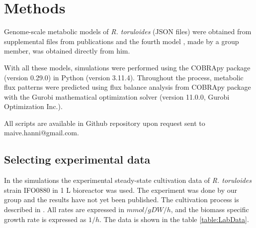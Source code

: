 \chapter{Methods}



Genome-scale metabolic models of \textit{R. toruloides} (JSON files) were obtained from supplemental
files from publications \cite{Tiukova2019, Dinh2019, Kim2021} and the fourth model \cite{DeBiaggi2023}, 
made by a group member, was obtained directly from him. 

With all these models, simulations were performed using the COBRApy
package (version 0.29.0) \cite{Ebrahim2013} in Python (version 3.11.4). 
Throughout the process, metabolic flux patterns were predicted using flux balance analysis \cite{Orth2010} from COBRApy package
with the Gurobi mathematical optimization solver (version 11.0.0, Gurobi Optimization Inc.).

All scripts are available in Github repository upon request sent to maive.hanni@gmail.com.


\section{Selecting experimental data}

In the simulations the experimental steady-state cultivation data of \textit{R. toruloides} strain IFO0880 in 1 L bioreactor was used.
The experiment was done by our group and the results have not yet been published. The cultivation process is described in \cite{Rekena2023}. 
All rates are expressed in $mmol/gDW/h$, and the biomass specific growth rate 
is expressed as ${1/h}$. The data is shown in the table \ref{table:LabData}.

